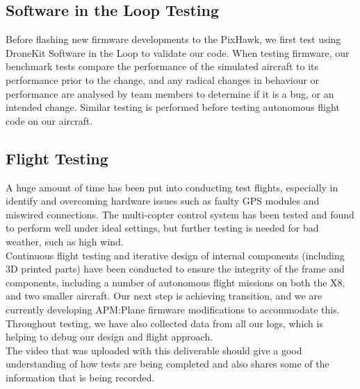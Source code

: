 \subsection{Software in the Loop Testing}
Before flashing new firmware developments to the PixHawk, we first test using DroneKit Software in the Loop to validate our code. When testing firmware, our benchmark tests compare the performance of the simulated aircraft to its performance prior to the change, and any radical changes in behaviour or performance are analysed by team members to determine if it is a bug, or an intended change. Similar testing is performed before testing autonomous flight code on our aircraft.

\subsection{Flight Testing}
A huge amount of time has been put into conducting test flights, especially in identify and overcoming hardware issues such as faulty GPS modules and miswired connections. The multi-copter control system has been tested and found to perform well under ideal settings, but further testing is needed for bad weather, such as high wind.\\

Continuous flight testing and iterative design of internal components (including 3D printed parts) have been conducted to ensure the integrity of the frame and components, including a number of autonomous flight missions on both the X8, and two smaller aircraft. Our next step is achieving transition, and we are currently developing APM:Plane firmware modifications to accommodate this. Throughout testing, we have also collected data from all our logs, which is helping to debug our design and flight approach.\\

The video that was uploaded with this deliverable should give a good understanding of how tests are being completed and also shares some of the information that is being recorded. 
